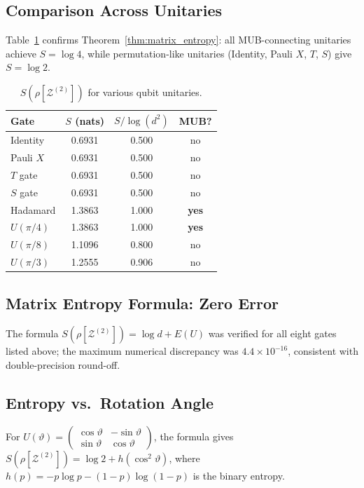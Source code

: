 \documentclass[12pt,a4paper]{article}
\begin{document}
\subsection{Comparison Across Unitaries}

Table~\ref{tab:gates} confirms Theorem~\ref{thm:matrix_entropy}: all
MUB-connecting unitaries achieve $S=\log 4$, while permutation-like unitaries
(Identity, Pauli $X$, $T$, $S$) give $S=\log 2$.

\begin{table}[h]
\centering
\caption{$S(\rho[\mathcal{Z}^{(2)}])$ for various qubit unitaries.}
\label{tab:gates}
\begin{tabular}{l|c|c|c}
Gate & $S$ (nats) & $S/\log(d^2)$ & MUB? \\ \hline
Identity & 0.6931 & 0.500 & no \\
Pauli $X$ & 0.6931 & 0.500 & no \\
$T$ gate & 0.6931 & 0.500 & no \\
$S$ gate & 0.6931 & 0.500 & no \\
Hadamard & 1.3863 & 1.000 & \textbf{yes} \\
$U(\pi/4)$ & 1.3863 & 1.000 & \textbf{yes} \\
$U(\pi/8)$ & 1.1096 & 0.800 & no \\
$U(\pi/3)$ & 1.2555 & 0.906 & no
\end{tabular}
\end{table}

\subsection{Matrix Entropy Formula: Zero Error}

The formula $S(\rho[\mathcal{Z}^{(2)}])=\log d+E(U)$ was verified for all
eight gates listed above; the maximum numerical discrepancy was
$4.4\times10^{-16}$, consistent with double-precision round-off.

\subsection{Entropy vs.\ Rotation Angle}

For $U(\vartheta)=\begin{pmatrix}\cos\vartheta&-\sin\vartheta\\\sin\vartheta&\cos\vartheta\end{pmatrix}$,
the formula gives $S(\rho[\mathcal{Z}^{(2)}])=\log 2+h(\cos^2\vartheta)$,
where $h(p)=-p\log p-(1-p)\log(1-p)$ is the binary entropy.
\end{document}
